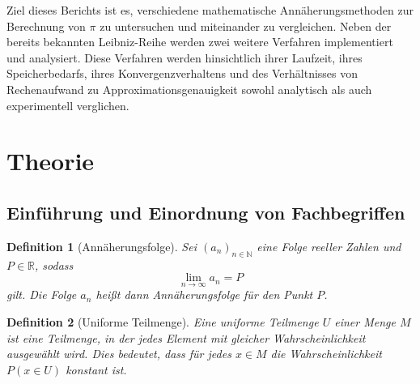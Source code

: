 \documentclass{scrartcl}
\newtheorem{definition}{Definition}
\theoremstyle{definition}
\newtheorem{approximation sequence}{Annäherungsfolge}
\begin{document}
Ziel dieses Berichts ist es, verschiedene mathematische Annäherungsmethoden zur
Berechnung von \(\pi\) zu untersuchen und miteinander zu vergleichen. Neben der
bereits bekannten Leibniz-Reihe werden zwei weitere Verfahren implementiert und
analysiert. Diese Verfahren werden hinsichtlich ihrer Laufzeit, ihres
Speicherbedarfs, ihres Konvergenzverhaltens und des Verhältnisses von
Rechenaufwand zu Approximationsgenauigkeit sowohl analytisch als auch
experimentell verglichen.

\section{Theorie}

\subsection{Einführung und Einordnung von Fachbegriffen}

\begin{definition}[Annäherungsfolge]
    Sei \((a_n)_{n \in \mathbb{N}}\) eine Folge reeller Zahlen und \(P \in
    \mathbb{R}\), sodass
    \begin{equation}
        \lim_{n \to \infty} a_n = P
    \end{equation}
    gilt. Die Folge \(a_n\) heißt dann Annäherungsfolge für den Punkt \(P\).
\end{definition}

\begin{definition}[Uniforme Teilmenge]
    Eine uniforme Teilmenge \(U\) einer Menge \(M\) ist eine Teilmenge, in der
    jedes Element mit gleicher Wahrscheinlichkeit ausgewählt wird.
    Dies bedeutet, dass für jedes \(x \in M\) die Wahrscheinlichkeit \(P(x \in U)\)
    konstant ist.
\end{definition}
\end{document}
